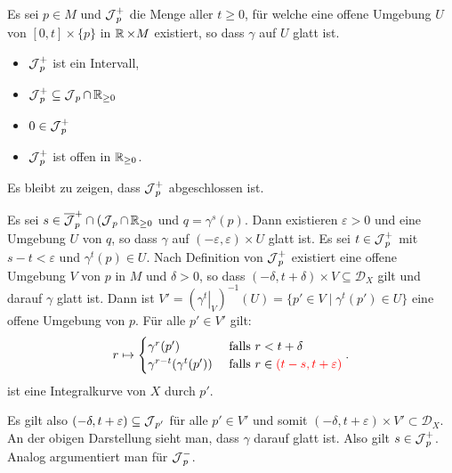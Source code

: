 \begin{bew}
Es sei $p \in M$ und $\operatorname{\mathcal{J}}_p^{+}$ die Menge aller $t \geq 0$, für welche eine offene Umgebung $U$ von $[0,t] \times \{p\}$ in $\operatorname{\mathbb{R}} \times M$ existiert, so dass $\gamma$ auf $U$ glatt ist.
\begin{itemize}
\item $\operatorname{\mathcal{J}}_p^{+}$ ist ein Intervall,
\item $\operatorname{\mathcal{J}}_p^{+} \subseteq \operatorname{\mathcal{J}}_p \cap \operatorname{\mathbb{R}}_{\geq 0}$
\item $0 \in \operatorname{\mathcal{J}}_p^{+}$
\item $\operatorname{\mathcal{J}}_p^{+}$ ist offen in $\operatorname{\mathbb{R}}_{\geq 0}$.
\end{itemize}
Es bleibt zu zeigen, dass $\operatorname{\mathcal{J}}_p^{+}$ abgeschlossen ist.

Es sei $s \in \overline {\operatorname{\mathcal{J}}}_p^{+} \cap (\operatorname{\mathcal{J}}_p \cap \operatorname{\mathbb{R}}_{\geq 0}$ und $q = \gamma^s(p)$.
Dann existieren $\varepsilon > 0$ und eine Umgebung $U$ von $q$, so dass $\gamma$ auf $(-\varepsilon,\varepsilon) \times U$ glatt ist.
Es sei $t \in \operatorname{\mathcal{J}}_p^{+}$ mit $s-t < \varepsilon$ und $\gamma^t(p) \in U$.
Nach Definition von $\operatorname{\mathcal{J}}_p^{+}$ existiert eine offene Umgebung $V$ von $p$ in $M$ und $\delta > 0$, so dass $(-\delta,t+\delta)\times V \subseteq \mathcal D_X$ gilt und darauf $\gamma$ glatt ist.
Dann ist $V' = \left(\left.\gamma^t\right|_V\right)^{-1}(U) = \{p' \in V \mid \gamma^t(p') \in U\}$ eine offene Umgebung von $p$.
Für alle $p' \in V'$ gilt:
\begin{align*}
	r \mapsto
	\begin{cases}
		\gamma^r(p') & \text{ falls } r < t+\delta\\
		\gamma^{r-t}(\gamma^t(p')) & \text{ falls } r \in \textcolor{red}{(t-s,t+\varepsilon)}
	\end{cases}.
\end{align*}
ist eine Integralkurve von $X$ durch $p'$.

Es gilt also $(-\delta,t+\varepsilon) \subseteq \operatorname{\mathcal{J}}_{p'}$ für alle $p' \in V'$ und somit $(-\delta,t+\varepsilon) \times V' \subset \mathcal D_X$. An der obigen Darstellung sieht man, dass $\gamma$ darauf glatt ist.
Also gilt $s \in \operatorname{\mathcal{J}}_p^{+}$. Analog argumentiert man für $\operatorname{\mathcal{J}}_p^{-}$.
\end{bew}

